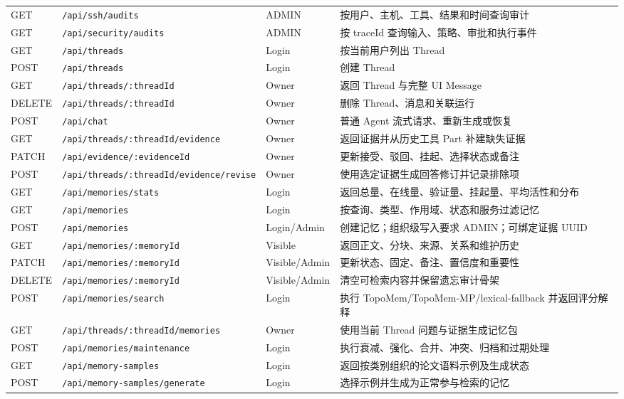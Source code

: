 \documentclass[conference,10pt]{IEEEtran}
\newcommand{\code}[1]{\texttt{#1}}
\begin{document}
\begin{table}[htbp]
\begin{tabularx}{\textwidth}{p{1.6cm}p{5.8cm}p{2.1cm}Y}
GET & \code{/api/ssh/audits} & ADMIN & 按用户、主机、工具、结果和时间查询审计 \\
GET & \code{/api/security/audits} & ADMIN & 按 traceId 查询输入、策略、审批和执行事件 \\
GET & \code{/api/threads} & Login & 按当前用户列出 Thread \\
POST & \code{/api/threads} & Login & 创建 Thread \\
GET & \code{/api/threads/:threadId} & Owner & 返回 Thread 与完整 UI Message \\
DELETE & \code{/api/threads/:threadId} & Owner & 删除 Thread、消息和关联运行 \\
POST & \code{/api/chat} & Owner & 普通 Agent 流式请求、重新生成或恢复 \\
GET & \code{/api/threads/:threadId/evidence} & Owner & 返回证据并从历史工具 Part 补建缺失证据 \\
PATCH & \code{/api/evidence/:evidenceId} & Owner & 更新接受、驳回、挂起、选择状态或备注 \\
POST & \code{/api/threads/:threadId/evidence/revise} & Owner & 使用选定证据生成回答修订并记录排除项 \\
GET & \code{/api/memories/stats} & Login & 返回总量、在线量、验证量、挂起量、平均活性和分布 \\
GET & \code{/api/memories} & Login & 按查询、类型、作用域、状态和服务过滤记忆 \\
POST & \code{/api/memories} & Login/Admin & 创建记忆；组织级写入要求 ADMIN；可绑定证据 UUID \\
GET & \code{/api/memories/:memoryId} & Visible & 返回正文、分块、来源、关系和维护历史 \\
PATCH & \code{/api/memories/:memoryId} & Visible/Admin & 更新状态、固定、备注、置信度和重要性 \\
DELETE & \code{/api/memories/:memoryId} & Visible/Admin & 清空可检索内容并保留遗忘审计骨架 \\
POST & \code{/api/memories/search} & Login & 执行 TopoMem/TopoMem-MP/lexical-fallback 并返回评分解释 \\
GET & \code{/api/threads/:threadId/memories} & Owner & 使用当前 Thread 问题与证据生成记忆包 \\
POST & \code{/api/memories/maintenance} & Login & 执行衰减、强化、合并、冲突、归档和过期处理 \\
GET & \code{/api/memory-samples} & Login & 返回按类别组织的论文语料示例及生成状态 \\
POST & \code{/api/memory-samples/generate} & Login & 选择示例并生成为正常参与检索的记忆 \\

\end{tabularx}
\end{table}
\end{document}
